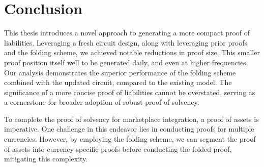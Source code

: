 
\chapter{Conclusion}

This thesis introduces a novel approach to generating a more compact proof of liabilities. 
Leveraging a fresh circuit design, along with leveraging prior proofs and the folding scheme, we achieved notable reductions in proof size. 
This smaller proof position itself well to be generated daily, and even at higher frequencies.
Our analysis demonstrates the superior performance of the folding scheme combined with the updated circuit, compared to the existing model. 
The significance of a more concise proof of liabilities cannot be overstated, serving as a cornerstone for broader adoption of robust proof of solvency.

To complete the proof of solvency for marketplace integration, a proof of assets is imperative. 
One challenge in this endeavor lies in conducting proofs for multiple currencies. 
However, by employing the folding scheme, we can segment the proof of assets into currency-specific proofs before conducting the folded proof, mitigating this complexity.